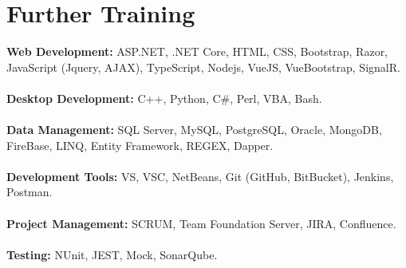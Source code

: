 \documentclass[letterpaper]{twentysecondcv} %
\begin{document}
\section{Further Training}
{
   {\textbf{Web Development:}} ASP.NET, .NET Core, HTML, CSS, Bootstrap, Razor, JavaScript (Jquery, AJAX), TypeScript, Nodejs, VueJS, VueBootstrap, SignalR.\\\\
   {\textbf{Desktop Development:}} C++, Python, C\#, Perl, VBA, Bash.\\\\
   {\textbf{Data Management:}} SQL Server, MySQL, PostgreSQL, Oracle, MongoDB, FireBase, LINQ, Entity Framework, REGEX, Dapper.\\\\
   {\textbf{Development Tools:}} VS, VSC, NetBeans, Git (GitHub, BitBucket), Jenkins, Postman.\\\\
   {\textbf{Project Management:}} SCRUM, Team Foundation Server, JIRA, Confluence.\\\\
   {\textbf{Testing:}} NUnit, JEST, Mock, SonarQube.
}
\end{document}
